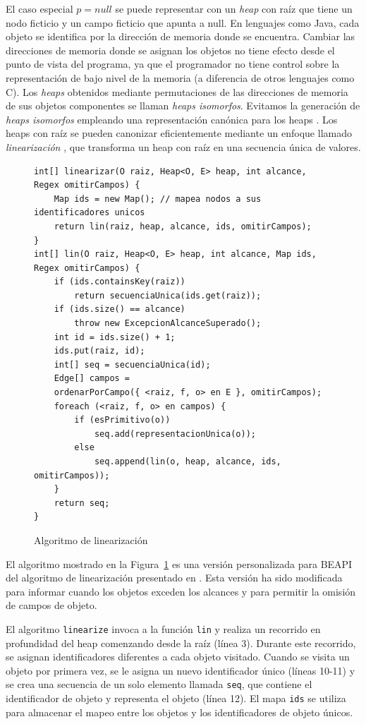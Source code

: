 El caso especial $p = null$ se puede representar con un \emph{heap} con raíz que tiene un nodo ficticio y un campo ficticio que apunta a null. En lenguajes como Java, cada objeto se identifica por la dirección de memoria donde se encuentra. Cambiar las direcciones de memoria donde se asignan los objetos no tiene efecto desde el punto de vista del programa, ya que el programador no tiene control sobre la representación de bajo nivel de la memoria (a diferencia de otros lenguajes como C). Los \emph{heaps} obtenidos mediante permutaciones de las direcciones de memoria de sus objetos componentes se llaman \emph{heaps isomorfos}. Evitamos la generación de \emph{heaps isomorfos} empleando una representación canónica para los heaps \cite{Iosif02,Boyapati02}. Los heaps con raíz se pueden canonizar eficientemente mediante un enfoque llamado \emph{linearización} \cite{Iosif02,Xie04}, que transforma un heap con raíz en una secuencia única de valores.

\bigbreak

\begin{figure}[!th]
\begin{lstlisting}
int[] linearizar(O raiz, Heap<O, E> heap, int alcance, Regex omitirCampos) {
    Map ids = new Map(); // mapea nodos a sus identificadores unicos
    return lin(raiz, heap, alcance, ids, omitirCampos);
}
int[] lin(O raiz, Heap<O, E> heap, int alcance, Map ids, Regex omitirCampos) {
    if (ids.containsKey(raiz))
        return secuenciaUnica(ids.get(raiz));
    if (ids.size() == alcance)
        throw new ExcepcionAlcanceSuperado();
    int id = ids.size() + 1;
    ids.put(raiz, id);
    int[] seq = secuenciaUnica(id);
    Edge[] campos =
    ordenarPorCampo({ <raiz, f, o> en E }, omitirCampos);
    foreach (<raiz, f, o> en campos) {
        if (esPrimitivo(o))
            seq.add(representacionUnica(o));
        else
            seq.append(lin(o, heap, alcance, ids, omitirCampos));
    }
    return seq;
}
\end{lstlisting}
\caption{Algoritmo de linearización}
\label{alg:linearization}
\end{figure}


El algoritmo mostrado en la Figura~\ref{alg:linearization} es una versión personalizada para \textsf{BEAPI} del algoritmo de linearización presentado en \cite{Xie04}. Esta versión ha sido modificada para informar cuando los objetos exceden los alcances y para permitir la omisión de campos de objeto.

El algoritmo \texttt{linearize} invoca a la función \texttt{lin} y realiza un recorrido en profundidad del heap comenzando desde la raíz (línea 3). Durante este recorrido, se asignan identificadores diferentes a cada objeto visitado. Cuando se visita un objeto por primera vez, se le asigna un nuevo identificador único (líneas 10-11) y se crea una secuencia de un solo elemento llamada \texttt{seq}, que contiene el identificador de objeto y representa el objeto (línea 12). El mapa \texttt{ids} se utiliza para almacenar el mapeo entre los objetos y los identificadores de objeto únicos.


